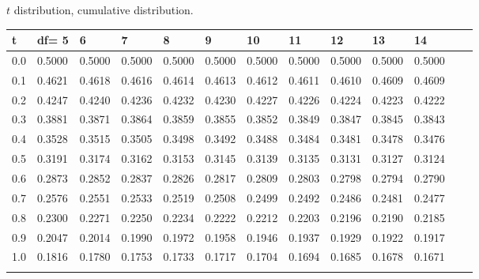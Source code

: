 \begin{frame}{\small $t$ distribution, cumulative distribution.}
  
  {
\fontsize{5pt}{5pt}
\selectfont

\begin{tabular}{l|llllllllllll} 
t  & df= 5  &  6  &  7  &  8  &  9  &  10  &  11  &  12  &  13  &  14     \\\hline 
 0.0 & 0.5000 & 0.5000 & 0.5000 & 0.5000 & 0.5000 & 0.5000 & 0.5000 & 0.5000 & 0.5000 & 0.5000  \\[5pt] \arrayrulecolor{light-gray}\hline\arrayrulecolor{black}  
 0.1 & 0.4621 & 0.4618 & 0.4616 & 0.4614 & 0.4613 & 0.4612 & 0.4611 & 0.4610 & 0.4609 & 0.4609  \\[5pt] \arrayrulecolor{light-gray}\hline\arrayrulecolor{black}  
 0.2 & 0.4247 & 0.4240 & 0.4236 & 0.4232 & 0.4230 & 0.4227 & 0.4226 & 0.4224 & 0.4223 & 0.4222  \\[5pt] \arrayrulecolor{light-gray}\hline\arrayrulecolor{black}  
 0.3 & 0.3881 & 0.3871 & 0.3864 & 0.3859 & 0.3855 & 0.3852 & 0.3849 & 0.3847 & 0.3845 & 0.3843  \\[5pt] \arrayrulecolor{light-gray}\hline\arrayrulecolor{black}  
 0.4 & 0.3528 & 0.3515 & 0.3505 & 0.3498 & 0.3492 & 0.3488 & 0.3484 & 0.3481 & 0.3478 & 0.3476  \\[5pt] \arrayrulecolor{light-gray}\hline\arrayrulecolor{black}  
 0.5 & 0.3191 & 0.3174 & 0.3162 & 0.3153 & 0.3145 & 0.3139 & 0.3135 & 0.3131 & 0.3127 & 0.3124  \\[5pt] \arrayrulecolor{light-gray}\hline\arrayrulecolor{black}  
 0.6 & 0.2873 & 0.2852 & 0.2837 & 0.2826 & 0.2817 & 0.2809 & 0.2803 & 0.2798 & 0.2794 & 0.2790  \\[5pt] \arrayrulecolor{light-gray}\hline\arrayrulecolor{black}  
 0.7 & 0.2576 & 0.2551 & 0.2533 & 0.2519 & 0.2508 & 0.2499 & 0.2492 & 0.2486 & 0.2481 & 0.2477  \\[5pt] \arrayrulecolor{light-gray}\hline\arrayrulecolor{black}  
 0.8 & 0.2300 & 0.2271 & 0.2250 & 0.2234 & 0.2222 & 0.2212 & 0.2203 & 0.2196 & 0.2190 & 0.2185  \\[5pt] \arrayrulecolor{light-gray}\hline\arrayrulecolor{black}  
 0.9 & 0.2047 & 0.2014 & 0.1990 & 0.1972 & 0.1958 & 0.1946 & 0.1937 & 0.1929 & 0.1922 & 0.1917  \\[5pt] \arrayrulecolor{light-gray}\hline\arrayrulecolor{black}  
 1.0 & 0.1816 & 0.1780 & 0.1753 & 0.1733 & 0.1717 & 0.1704 & 0.1694 & 0.1685 & 0.1678 & 0.1671  \\[5pt] \arrayrulecolor{light-gray}\hline\arrayrulecolor{black}  

\end{tabular}}
\end{frame}
